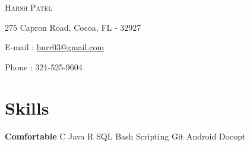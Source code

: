 \documentclass{my_resume_class}
\newcommand{\name}[1]{
   \centerline{\textsc{\huge{#1}}}
}
\newcommand{\contact}[1]{
   \centerline{\normalsize{#1}}
}
\begin{document}
\name{Harsh Patel}
\vspace{0.1cm}
\contact{275 Capron Road, Cocoa, FL - 32927}
\vspace{0.05cm}
\contact{E-mail : \href{mailto:hurr03@gmail.com}{hurr03@gmail.com}}
\vspace{0.05cm}
\contact{Phone : 321-525-9604 }

\section{Skills}
{\textbf{Comfortable}  \hspace{0.80cm} C\hspace{0.50cm} Java\hspace{0.50cm} R\hspace{0.50cm} SQL\hspace{0.50cm} Bash Scripting\hspace{0.50cm} Git\hspace{0.50cm} Android\hspace{0.50cm} Docopt } \\
\end{document}
